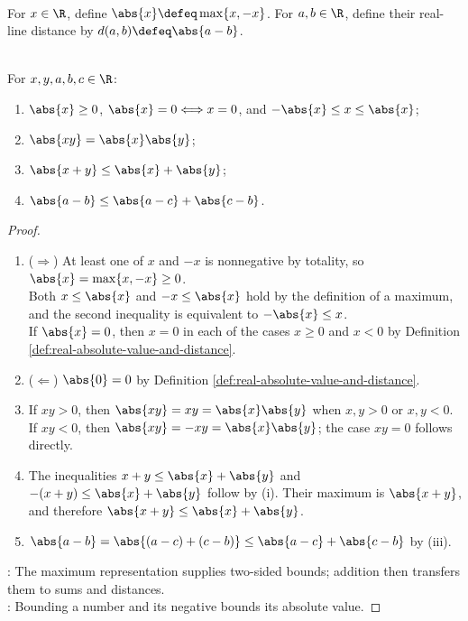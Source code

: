 \begin{definition} \label{def:real-absolute-value-and-distance} \\
For $x\in\R$, define $\abs{x}\defeq\max\{x,-x\}$. For $a,b\in\R$, define their real-line distance by $d(a,b)\defeq\abs{a-b}$.
\end{definition}

\begin{proposition} \label{prop:real-absolute-value-triangle-inequality} \\
For $x,y,a,b,c\in\R$:
\begin{enumerate}[label=(\roman*)]
\setlength{\itemsep}{0pt}
\item $\abs{x}\geq0$, $\abs{x}=0\Longleftrightarrow x=0$, and $-\abs{x}\leq x\leq\abs{x}$;
\item $\abs{xy}=\abs{x}\abs{y}$;
\item $\abs{x+y}\leq\abs{x}+\abs{y}$;
\item $\abs{a-b}\leq\abs{a-c}+\abs{c-b}$.
\end{enumerate}
\begin{proof}
\begin{enumerate}[label=(\roman*)]
\setlength{\itemsep}{0pt}
\item[$(i)$] ($\Rightarrow$) At least one of $x$ and $-x$ is nonnegative by totality, so $\abs{x}=\max\{x,-x\}\geq0$.\\
Both $x\leq\abs{x}$ and $-x\leq\abs{x}$ hold by the definition of a maximum, and the second inequality is equivalent to $-\abs{x}\leq x$.\\
If $\abs{x}=0$, then $x=0$ in each of the cases $x\geq0$ and $x<0$ by Definition \ref{def:real-absolute-value-and-distance}.
\item[$(i)$] ($\Leftarrow$) $\abs{0}=0$ by Definition \ref{def:real-absolute-value-and-distance}.
\item[$(ii)$] If $xy>0$, then $\abs{xy}=xy=\abs{x}\abs{y}$ when $x,y>0$ or $x,y<0$. If $xy<0$, then $\abs{xy}=-xy=\abs{x}\abs{y}$; the case $xy=0$ follows directly.
\item[$(iii)$] The inequalities $x+y\leq\abs{x}+\abs{y}$ and $-(x+y)\leq\abs{x}+\abs{y}$ follow by (i). Their maximum is $\abs{x+y}$, and therefore $\abs{x+y}\leq\abs{x}+\abs{y}$.
\item[$(iv)$] $\abs{a-b}=\abs{(a-c)+(c-b)}\leq\abs{a-c}+\abs{c-b}$ by (iii).
\end{enumerate}
: The maximum representation supplies two-sided bounds; addition then transfers them to sums and distances.\\
: Bounding a number and its negative bounds its absolute value.
\end{proof}
\end{proposition}

